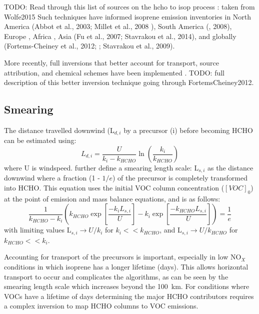     TODO: Read through this list of sources on the hcho to isop process : taken from Wolfe2015
    Such techniques have informed isoprene emission inventories in North America (Abbot et al., 2003; Millet et al., 2008 \citep{Palmer2003,Millet2006,Palmer2006}), South America (\citep{Barkley2013}, 2008), Europe \citep{Curci2010,Dufour2009}, Africa \citep{Marais2012}, Asia (Fu et al., 2007; Stavrakou et al., 2014), and globally (Fortems-Cheiney et al., 2012; \citep{Shim2005}; Stavrakou et al., 2009).
    
    More recently, full inversions that better account for transport, source attribution, and chemical schemes have been implemented \citep{FortemsCheiney2012}.
    TODO: full description of this better inversion technique going through FortemsCheiney2012.
  
  \subsection{Smearing}
  \label{ch_LitRev:sec:smearing}
    The distance travelled downwind (L$_{d,i}$ by a precursor (i) before becoming HCHO can be estimated using:
    \begin{equation*}
      L_{d,i} = \frac{U}{k_i - k_{HCHO}} \ln{ \left( \frac{k_i}{k_{HCHO}} \right) }
    \end{equation*}
    where U is windspeed.
    \citet{Palmer2003} further define a smearing length scale: L$_{s,i}$ as the distance downwind where a fraction (1 - $1/e$) of the precursor is completely transformed into HCHO.
    This equation uses the initial VOC column concentration ($[VOC]_0$) at the point of emission and mass balance equations, and is as follows:
    \begin{equation}
      \frac{1}{k_{HCHO}-k_i} \left( k_{HCHO} \exp{ \left[ \frac{-k_i L_{s,i}}{U} \right]} -k_i \exp{ \left[ \frac{-k_{HCHO} L_{s,i}}{U} \right]} \right) = \frac{1}{e} 
    \end{equation}
    with limiting values L$_{s,i} \rightarrow U/k_i$ for $k_i << k_{HCHO}$, and L$_{s,i} \rightarrow U/k_{HCHO}$ for $k_{HCHO} << k_i$.  
    
    Accounting for transport of the precursors is important, especially in low NO$_X$ conditions in which isoprene has a longer lifetime (days).
    This allows horizontal transport to occur and complicates the algorithms, as can be seen by the smearing length scale which increases beyond the 100~km.
    For conditions where VOCs have a lifetime of days determining the major HCHO contributors requires a complex inversion to map HCHO columns to VOC emissions.
    
